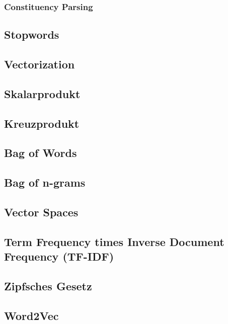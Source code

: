 \subsubsection{Constituency Parsing}


\subsection{Stopwords}


\subsection{Vectorization}


\subsection{Skalarprodukt}

\subsection{Kreuzprodukt}


\subsection{Bag of Words}


\subsection{Bag of n-grams}


\subsection{Vector Spaces}


\subsection{Term Frequency times Inverse Document Frequency (TF-IDF)}


\subsection{Zipfsches Gesetz}


\subsection{Word2Vec}


